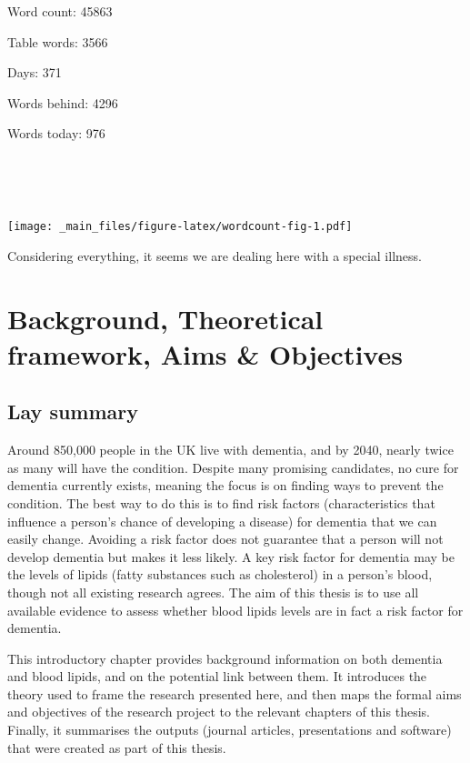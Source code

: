\documentclass[a4paper, twoside]{templates/ociamthesis}
\begin{document}
\adjustmtc

Word count: 45863

Table words: 3566

Days: 371

Words behind: 4296

Words today: 976

~

~

\texttt{[image: \_main\_files/figure-latex/wordcount-fig-1.pdf]}

\begin{savequote}
Considering everything, it seems we are dealing here with a special
illness.
\end{savequote}



\hypertarget{background-heading}{%
\chapter{Background, Theoretical framework, Aims \& Objectives}\label{background-heading}}

\minitoc 

\hypertarget{lay-summary}{%
\section{Lay summary}\label{lay-summary}}

Around 850,000 people in the UK live with dementia, and by 2040, nearly twice as many will have the condition. Despite many promising candidates, no cure for dementia currently exists, meaning the focus is on finding ways to prevent the condition. The best way to do this is to find risk factors (characteristics that influence a person's chance of developing a disease) for dementia that we can easily change. Avoiding a risk factor does not guarantee that a person will not develop dementia but makes it less likely. A key risk factor for dementia may be the levels of lipids (fatty substances such as cholesterol) in a person's blood, though not all existing research agrees. The aim of this thesis is to use all available evidence to assess whether blood lipids levels are in fact a risk factor for dementia.

This introductory chapter provides background information on both dementia and blood lipids, and on the potential link between them. It introduces the theory used to frame the research presented here, and then maps the formal aims and objectives of the research project to the relevant chapters of this thesis. Finally, it summarises the outputs (journal articles, presentations and software) that were created as part of this thesis.
\end{document}
